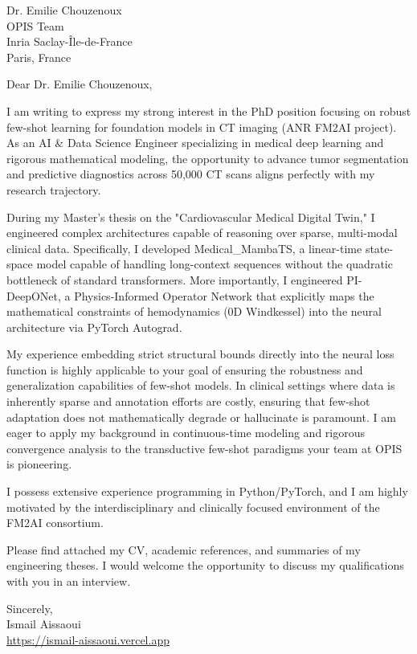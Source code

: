 \documentclass[11pt, a4paper]{letter}
\begin{document}
\begin{letter}{Dr. Emilie Chouzenoux \\ OPIS Team \\ Inria Saclay-Île-de-France \\ Paris, France}
\opening{Dear Dr. Emilie Chouzenoux,}

I am writing to express my strong interest in the PhD position focusing on robust few-shot learning for foundation models in CT imaging (ANR FM2AI project). As an AI \& Data Science Engineer specializing in medical deep learning and rigorous mathematical modeling, the opportunity to advance tumor segmentation and predictive diagnostics across 50,000 CT scans aligns perfectly with my research trajectory.

During my Master's thesis on the "Cardiovascular Medical Digital Twin," I engineered complex architectures capable of reasoning over sparse, multi-modal clinical data. Specifically, I developed Medical\_MambaTS, a linear-time state-space model capable of handling long-context sequences without the quadratic bottleneck of standard transformers. More importantly, I engineered PI-DeepONet, a Physics-Informed Operator Network that explicitly maps the mathematical constraints of hemodynamics (0D Windkessel) into the neural architecture via PyTorch Autograd. 

My experience embedding strict structural bounds directly into the neural loss function is highly applicable to your goal of ensuring the robustness and generalization capabilities of few-shot models. In clinical settings where data is inherently sparse and annotation efforts are costly, ensuring that few-shot adaptation does not mathematically degrade or hallucinate is paramount. I am eager to apply my background in continuous-time modeling and rigorous convergence analysis to the transductive few-shot paradigms your team at OPIS is pioneering.

I possess extensive experience programming in Python/PyTorch, and I am highly motivated by the interdisciplinary and clinically focused environment of the FM2AI consortium.

Please find attached my CV, academic references, and summaries of my engineering theses. I would welcome the opportunity to discuss my qualifications with you in an interview.

\closing{Sincerely, \\ Ismail Aissaoui \\ \href{https://ismail-aissaoui.vercel.app}{https://ismail-aissaoui.vercel.app}}
\end{letter}
\end{document}
